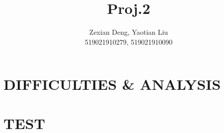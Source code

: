 \documentclass[conference]{IEEEtran}
\begin{document}
\title{Proj.2}

\author{Zexian Deng, Yaotian Liu \\  519021910279, 519021910090}
\date{}

\maketitle



\section{DIFFICULTIES \& ANALYSIS}









\section{TEST}




\printbibliography
\end{document}
